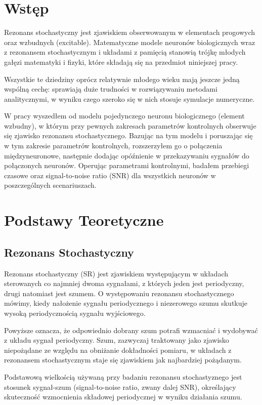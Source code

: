 \documentclass[12pt]{article}
\begin{document}
  \section{Wstęp}
  Rezonans stochastyczny jest zjawiskiem obserwowanym w elementach progowych oraz wzbudnych (excitable). Matematyczne modele neuronów biologicznych wraz z rezonansem stochastycznym i układami z pamięcią stanowią trójkę młodych gałęzi matematyki i fizyki, które składają się na przedmiot niniejszej pracy.
  
  Wszystkie te dziedziny oprócz relatywnie młodego wieku mają jeszcze jedną wspólną cechę: sprawiają duże trudności w rozwiązywaniu metodami analitycznymi, w wyniku czego szeroko się w nich stosuje symulacje numeryczne.
  
  W pracy wyszedłem od modelu pojedynczego neuronu biologicznego (element wzbudny), w którym przy pewnych zakresach parametrów kontrolnych obserwuje się zjawisko rezonansu stochastycznego. Bazując na tym modelu i poruszając się w tym zakresie parametrów kontrolnych, rozszerzyłem go o połączenia międzyneuronowe, następnie dodając opóźnienie w przekazywaniu sygnałów do połączonych neuronów. Operując parametrami kontrolnymi, badałem przebiegi czasowe oraz signal-to-noise ratio (SNR) dla wszystkich neuronów w poszczególnych scenariuszach. 
  
  
  \section{Podstawy Teoretyczne}
  
  \subsection{Rezonans Stochastyczny}
  
  Rezonans stochastyczny (SR) jest zjawiskiem występującym w układach sterowanych co najmniej dwoma sygnałami, z których jeden jest periodyczny, drugi natomiast jest szumem. O występowaniu rezonansu stochastycznego mówimy, kiedy nałożenie sygnału periodycznego i niezerowego szumu skutkuje wysoką periodycznością sygnału wyjściowego.
  
  Powyższe oznacza, że odpowiednio dobrany szum potrafi wzmacniać i wydobywać z układu sygnał periodyczny. Szum, zazwyczaj traktowany jako zjawisko niepożądane ze względu na obniżanie dokładności pomiaru, w układach z rezonansem stochastycznym staje się zjawiskiem jak najbardziej pożądanym. 
  
  Podstawową wielkością używaną przy badaniu rezonansu stochastyznego jest stosunek sygnał-szum (signal-to-noise ratio, zwany dalej SNR), określający skuteczność wzmocnienia składowej periodycznej w wyniku działania szumu.
\end{document}
